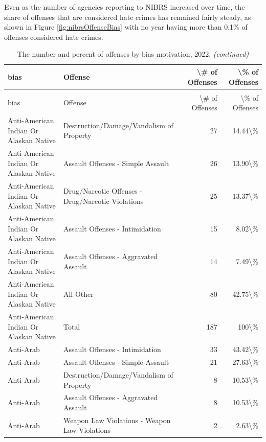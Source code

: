 \documentclass[
]{krantz}
\begin{document}
Even as the number of agencies reporting to NIBRS increased
over time, the share of offenses that are considered hate
crimes has remained fairly steady, as shown in Figure
\ref{fig:nibrsOffenseBias} with no year having more than
0.1\% of offenses considered hate crimes.

\begin{longtable}[t]{l|l|r|r}
\caption{\label{tab:offenseBiasOffense}The number and percent of offenses by bias motivation, 2022. }\\
\hline
bias & Offense & \textbackslash{}\# of Offenses & \textbackslash{}\% of Offenses\\
\hline
\endfirsthead
\caption[]{\label{tab:offenseBiasOffense}The number and percent of offenses by bias motivation, 2022.  \textit{(continued)}}\\
\hline
bias & Offense & \textbackslash{}\# of Offenses & \textbackslash{}\% of Offenses\\
\hline
\endhead
Anti-American Indian Or Alaskan Native & Destruction/Damage/Vandalism of Property & 27 & 14.44\textbackslash{}\%\\
\hline
Anti-American Indian Or Alaskan Native & Assault Offenses - Simple Assault & 26 & 13.90\textbackslash{}\%\\
\hline
Anti-American Indian Or Alaskan Native & Drug/Narcotic Offenses - Drug/Narcotic Violations & 25 & 13.37\textbackslash{}\%\\
\hline
Anti-American Indian Or Alaskan Native & Assault Offenses - Intimidation & 15 & 8.02\textbackslash{}\%\\
\hline
Anti-American Indian Or Alaskan Native & Assault Offenses - Aggravated Assault & 14 & 7.49\textbackslash{}\%\\
\hline
Anti-American Indian Or Alaskan Native & All Other & 80 & 42.75\textbackslash{}\%\\
\hline
Anti-American Indian Or Alaskan Native & Total & 187 & 100\textbackslash{}\%\\
\hline
Anti-Arab & Assault Offenses - Intimidation & 33 & 43.42\textbackslash{}\%\\
\hline
Anti-Arab & Assault Offenses - Simple Assault & 21 & 27.63\textbackslash{}\%\\
\hline
Anti-Arab & Destruction/Damage/Vandalism of Property & 8 & 10.53\textbackslash{}\%\\
\hline
Anti-Arab & Assault Offenses - Aggravated Assault & 8 & 10.53\textbackslash{}\%\\
\hline
Anti-Arab & Weapon Law Violations - Weapon Law Violations & 2 & 2.63\textbackslash{}\%\\

\end{longtable}
\end{document}
